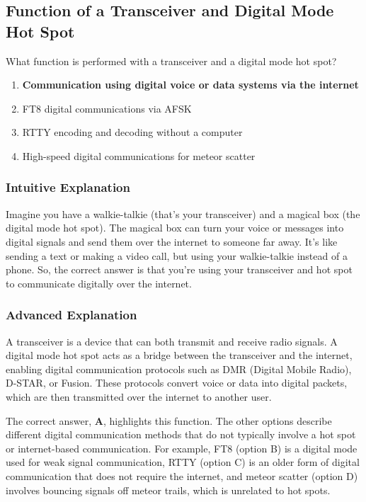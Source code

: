 \subsection{Function of a Transceiver and Digital Mode Hot Spot}
\label{T4A10}

\begin{tcolorbox}[colback=gray!10!white,colframe=black!75!black,title=T4A10]
What function is performed with a transceiver and a digital mode hot spot?
\begin{enumerate}[label=\Alph*)]
    \item \textbf{Communication using digital voice or data systems via the internet}
    \item FT8 digital communications via AFSK
    \item RTTY encoding and decoding without a computer
    \item High-speed digital communications for meteor scatter
\end{enumerate}
\end{tcolorbox}

\subsubsection{Intuitive Explanation}
Imagine you have a walkie-talkie (that's your transceiver) and a magical box (the digital mode hot spot). The magical box can turn your voice or messages into digital signals and send them over the internet to someone far away. It’s like sending a text or making a video call, but using your walkie-talkie instead of a phone. So, the correct answer is that you’re using your transceiver and hot spot to communicate digitally over the internet.

\subsubsection{Advanced Explanation}
A transceiver is a device that can both transmit and receive radio signals. A digital mode hot spot acts as a bridge between the transceiver and the internet, enabling digital communication protocols such as DMR (Digital Mobile Radio), D-STAR, or Fusion. These protocols convert voice or data into digital packets, which are then transmitted over the internet to another user. 

The correct answer, \textbf{A}, highlights this function. The other options describe different digital communication methods that do not typically involve a hot spot or internet-based communication. For example, FT8 (option B) is a digital mode used for weak signal communication, RTTY (option C) is an older form of digital communication that does not require the internet, and meteor scatter (option D) involves bouncing signals off meteor trails, which is unrelated to hot spots.


